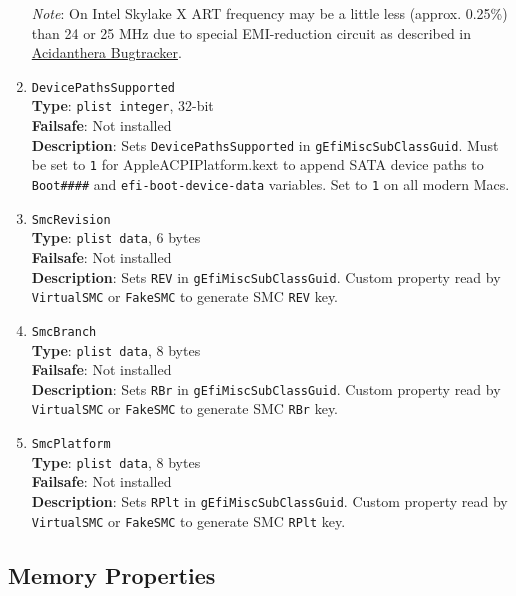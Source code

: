 \documentclass[]{article}
\begin{document}
\begin{enumerate}
  \emph{Note}: On Intel Skylake X ART frequency may be a little less (approx. 0.25\%) than
  24 or 25 MHz due to special EMI-reduction circuit as described in
  \href{https://github.com/acidanthera/bugtracker/issues/448#issuecomment-524914166}{Acidanthera Bugtracker}.
\item
  \texttt{DevicePathsSupported}\\
  \textbf{Type}: \texttt{plist\ integer}, 32-bit\\
  \textbf{Failsafe}: Not installed\\
  \textbf{Description}: Sets \texttt{DevicePathsSupported} in
  \texttt{gEfiMiscSubClassGuid}. Must be set to \texttt{1} for
  AppleACPIPlatform.kext to append SATA device paths to
  \texttt{Boot\#\#\#\#} and \texttt{efi-boot-device-data} variables.
  Set to \texttt{1} on all modern Macs.
\item
  \texttt{SmcRevision}\\
  \textbf{Type}: \texttt{plist\ data}, 6 bytes\\
  \textbf{Failsafe}: Not installed\\
  \textbf{Description}: Sets \texttt{REV} in
  \texttt{gEfiMiscSubClassGuid}. Custom property read by
  \texttt{VirtualSMC} or \texttt{FakeSMC} to generate SMC \texttt{REV}
  key.
\item
  \texttt{SmcBranch}\\
  \textbf{Type}: \texttt{plist\ data}, 8 bytes\\
  \textbf{Failsafe}: Not installed\\
  \textbf{Description}: Sets \texttt{RBr} in
  \texttt{gEfiMiscSubClassGuid}. Custom property read by
  \texttt{VirtualSMC} or \texttt{FakeSMC} to generate SMC \texttt{RBr}
  key.
\item
  \texttt{SmcPlatform}\\
  \textbf{Type}: \texttt{plist\ data}, 8 bytes\\
  \textbf{Failsafe}: Not installed\\
  \textbf{Description}: Sets \texttt{RPlt} in
  \texttt{gEfiMiscSubClassGuid}. Custom property read by
  \texttt{VirtualSMC} or \texttt{FakeSMC} to generate SMC \texttt{RPlt}
  key.
\end{enumerate}

\subsection{Memory Properties}\label{platforminfomemory}
\end{document}
